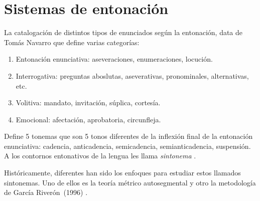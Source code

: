 \chapter{Sistemas de entonaci\'on} \label{sistemasent}
La catalogaci\'on de distintos tipos de enunciados seg\'un la entonaci\'on, data de Tom\'as Navarro que define varias categor\'ias:


\begin{enumerate}
\item Entonaci\'on enunciativa: aseveraciones, enumeraciones, locuci\'on.
\item Interrogativa: preguntas aboslutas, aseverativas, pronominales, alternativas, etc. 
\item Volitiva: mandato, invitaci\'on, s\'uplica, cortes\'ia.
\item Emocional: afectaci\'on, aprobatoria, circunfleja.
\end{enumerate}


 Define 5 tonemas que son 5 tonos diferentes de la inflexi\'on final de la entonaci\'on enunciativa: cadencia, anticadencia, semicadencia, semianticadencia, suspensi\'on. A los contornos entonativos de la lengua les llama \emph{sintonema} \cite{ruiz2014entonacion}.


Hist\'oricamente, diferentes han sido los enfoques para estudiar estos llamados sintonemas. Uno de ellos es la teor\'ia m\'etrico autosegmental y otro la metodolog\'ia de Garc\'ia River\'on~(1996) \cite{garcia1996aspectos1,garcia1996aspectos2}.

